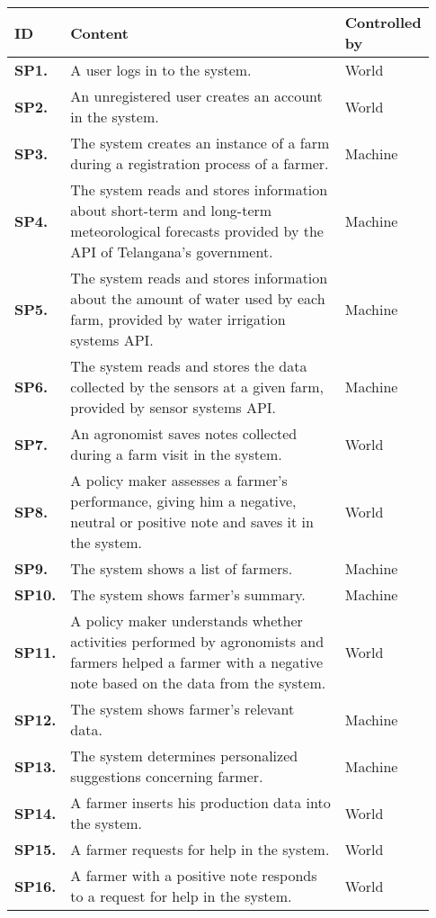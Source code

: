 \begin{longtable}{@{}p{0.06\linewidth} p{0.67\linewidth} p{0.20\linewidth}@{}}
	\toprule
	\textbf{ID}  & \textbf{Content} & \textbf{Controlled by}\\
	\midrule
    \textbf{SP1.} & A user logs in to the system. & World \\
    \textbf{SP2.} & An unregistered user creates an account in the system. & World \\
    \textbf{SP3.} & The system creates an instance of a farm during a registration process of a farmer. & Machine \\
    \textbf{SP4.} & The system reads and stores information about short-term and long-term meteorological forecasts provided by the API of Telangana's government. & Machine \\
    \textbf{SP5.} & The system reads and stores information about the amount of water used by each farm, provided by water irrigation systems API. & Machine \\
    \textbf{SP6.} & The system reads and stores the data collected by the sensors at a given farm, provided by sensor systems API. & Machine \\
    \textbf{SP7.} & An agronomist saves notes collected during a farm visit in the system. & World \\
    \textbf{SP8.} & A policy maker assesses a farmer's performance, giving him a negative, neutral or positive note and saves it in the system. & World \\
    \textbf{SP9.} & The system shows a list of farmers. & Machine \\
    \textbf{SP10.} & The system shows farmer's summary. & Machine \\
    \textbf{SP11.} & A policy maker understands whether activities performed by agronomists and farmers helped a farmer with a negative note based on the data from the system. & World \\
    \textbf{SP12.} & The system shows farmer's relevant data. & Machine \\
    \textbf{SP13.} & The system determines personalized suggestions concerning farmer. & Machine \\
    \textbf{SP14.} & A farmer inserts his production data into the system. & World \\
    \textbf{SP15.} & A farmer requests for help in the system. & World \\
    \textbf{SP16.} & A farmer with a positive note responds to a request for help in the system. & World \\

\end{longtable}
